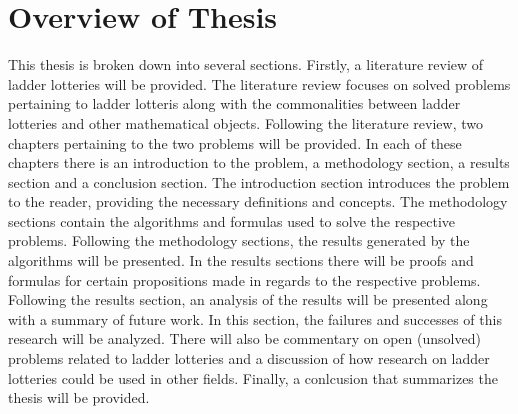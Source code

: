 \section{Overview of Thesis}
This thesis is broken down into several sections. Firstly, a literature 
review of ladder lotteries will be provided. The literature review focuses on solved problems pertaining 
to ladder lotteris along with the commonalities between ladder lotteries and 
other mathematical objects. Following the literature review, two chapters pertaining to the two problems will be 
provided. In each of these chapters there is an introduction to the problem, a methodology section, a results 
section and a conclusion section. The introduction section introduces the problem to the reader, providing the necessary 
definitions and concepts. The methodology sections contain the algorithms and formulas used to solve the respective problems. 
Following the methodology sections, the results generated by the algorithms will be presented.
In the results sections there will be proofs and formulas for certain propositions made in regards to the respective problems. 
Following the results section, an analysis of the results will be presented along with a summary of future work. In this section,
the failures and successes of this research will be analyzed. There will also be commentary on 
open (unsolved) problems related to ladder lotteries and a 
discussion of how research on ladder lotteries could be used in other fields.
Finally, a conlcusion that summarizes the thesis will be provided.